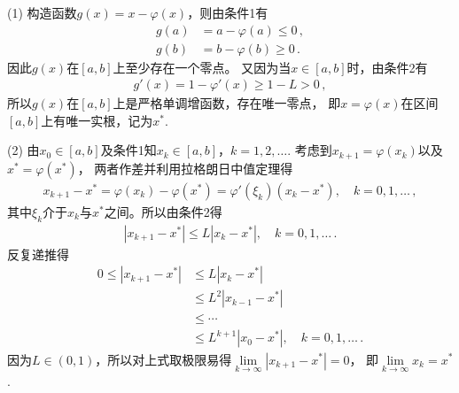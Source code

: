 \begin{prove}
    (1) 构造函数$g(x)=x-\varphi(x)$，则由条件1有
    \begin{align}\label{eq:02ex0312}
        g(a) & =a-\varphi(a)\le0\, , \\
        g(b) & =b-\varphi(b)\ge0\, .
    \end{align}
    因此$g(x)$在$[a,b]$上至少存在一个零点。
    又因为当$x\in[a,b]$时，由条件2有
    \begin{align}\label{eq:02ex0313}
        g'(x)=1-\varphi'(x)\ge1-L>0\, ,
    \end{align}
    所以$g(x)$在$[a,b]$上是严格单调增函数，存在唯一零点，
    即$x=\varphi(x)$在区间$[a,b]$上有唯一实根，记为$x^*$.

    (2) 由$x_0\in[a,b]$及条件1知$x_k\in[a,b]$，$k=1,2,\ldots$.
    考虑到$x_{k+1}=\varphi(x_k)$以及$x^*=\varphi(x^*)$，
    两者作差并利用拉格朗日中值定理得
    \begin{align}\label{eq:02ex0314}
        x_{k+1}-x^*=\varphi(x_k)-\varphi(x^*)=\varphi'(\xi_k)(x_k-x^*),\quad k=0,1,\ldots\, ,
    \end{align}
    其中$\xi_k$介于$x_k$与$x^*$之间。所以由条件2得
    \begin{align}\label{eq:02ex0314.5}
        |x_{k+1}-x^*|\le L|x_k-x^*|,\quad k=0,1,\ldots\, .
    \end{align}
    反复递推得
    \begin{align}\label{eq:02ex0315}
        0\le|x_{k+1}-x^*| & \le L|x_k-x^*|\nonumber                     \\
                          & \le L^2|x_{k-1}-x^*|\nonumber               \\
                          & \le\cdots\nonumber                          \\
                          & \le L^{k+1}|x_0-x^*|,\quad k=0,1,\ldots\, .
    \end{align}
    因为$L\in(0,1)$，所以对上式取极限易得$\displaystyle\lim\limits_{k\rightarrow\infty}{|x_{k+1}-x^*|}=0$，
    即$\displaystyle\lim\limits_{k\rightarrow\infty}{x_k}=x^*$.


\end{prove}
